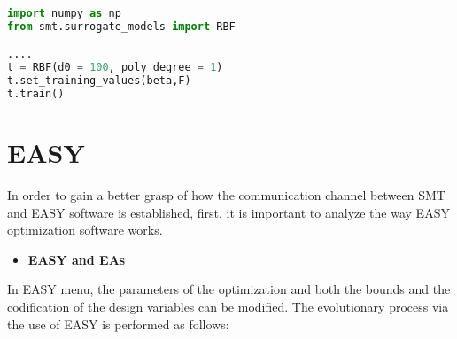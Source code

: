 \begin{itemize}
\begin{lstlisting}[language = Python, caption = Training of KPLSK model with noisy observations via SMT]
import numpy as np
from smt.surrogate_models import RBF

.... 
t = RBF(d0 = 100, poly_degree = 1)   
t.set_training_values(beta,F)
t.train()
\end{lstlisting}

\end{itemize}



\newpage




\chapter{EASY}
\label{appendix:EASY}
In order to gain a better grasp of how the communication 
channel between SMT and EASY\cite{EASY} software is 
established, first, it is important to analyze the way 
EASY optimization software works. 

\begin{itemize}
\item \textbf{EASY and EAs}
\end{itemize}
 
In EASY menu, the parameters of the optimization and 
both the bounds and the codification of the design variables 
can be modified. The evolutionary process via the use of EASY 
is performed as follows:

